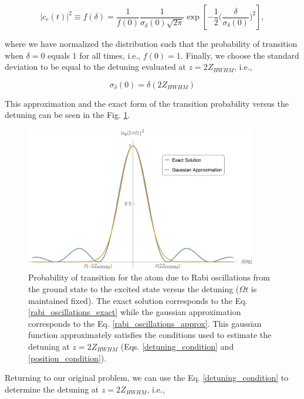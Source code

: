 \documentclass{article}
\begin{document}
\begin{equation}\label{rabi_oscillations_approx}
  |c_{e}(t)|^{2} \equiv f(\delta) = \frac{1}{f (0)} \frac{1}{\sigma_{\delta}(0) \sqrt{2 \pi}} \exp \left[-\frac{1}{2}\bigg(\frac{\delta}{\sigma_{\delta}(0)}\bigg)^{2} \right],
\end{equation}

where we have normalized the distribution such that the probability of transition when $\delta = 0$ equals $1$ for all times, i.e., $f(0)=1$. Finally, we choose the standard deviation to be equal to the detuning evaluated at  $z=2Z_{HWHM}$, i.e.,

\begin{equation}
    \sigma_{\delta}(0) = \delta(2Z_{HWHM})
\end{equation}

This approximation and the exact form of the transition probability versus the detuning can be seen in the Fig. \ref{ce2_VS_detuning}.

\begin{figure}
    \centering
    \includegraphics[width=0.9\textwidth]{ce2_VS_detuning_general.png}
     \caption{Probability of transition for the atom due to Rabi oscillations from the ground state to the excited state versus the detuning ($\Omega t$ is maintained fixed). The exact solution corresponds to the Eq. \ref{rabi_oscillations_exact} while the gaussian approximation corresponds to the Eq. \ref{rabi_oscillations_approx}. This gaussian function approximately satisfies the conditions used to estimate the detuning at $z=2Z_{HWHM}$ (Eqs. \ref{detuning_condition} and \ref{position_condition}).}
     \label{ce2_VS_detuning}
\end{figure}

Returning to our original problem, we can use the Eq. \ref{detuning_condition} to determine the detuning at $z=2Z_{HWHM}$, i.e.,
\end{document}
